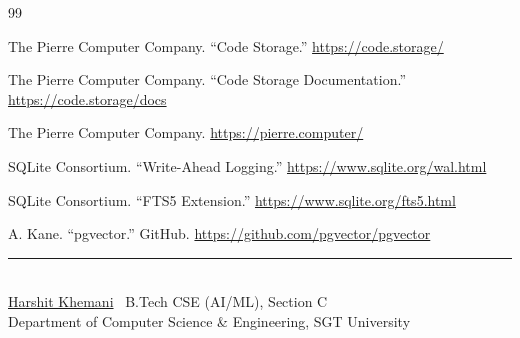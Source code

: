 \documentclass[11pt,a4paper]{article}
\newcommand{\khe}{\href{https://www.khe.money}{Harshit Khemani}}
\begin{document}
\begin{thebibliography}{99}
{ The Pierre Computer Company. ``Code Storage.''
\url{https://code.storage/}

 The Pierre Computer Company. ``Code Storage
Documentation.'' \url{https://code.storage/docs}

 The Pierre Computer Company.
\url{https://pierre.computer/}

 SQLite Consortium. ``Write-Ahead Logging.''
\url{https://www.sqlite.org/wal.html}

 SQLite Consortium. ``FTS5 Extension.''
\url{https://www.sqlite.org/fts5.html}

 A. Kane. ``pgvector.'' GitHub.
\url{https://github.com/pgvector/pgvector}
}
\end{thebibliography}

\vspace{1.2\baselineskip}
{\color{blue200}\rule{\textwidth}{0.5pt}}\\[5pt]
{\footnotesize\sffamily\color{grey600}
\khe\ \quad\textperiodcentered{} \quad\textperiodcentered\quad
B.Tech CSE (AI/ML), Section C\\[2pt]
Department of Computer Science \& Engineering, SGT University}
\end{document}
